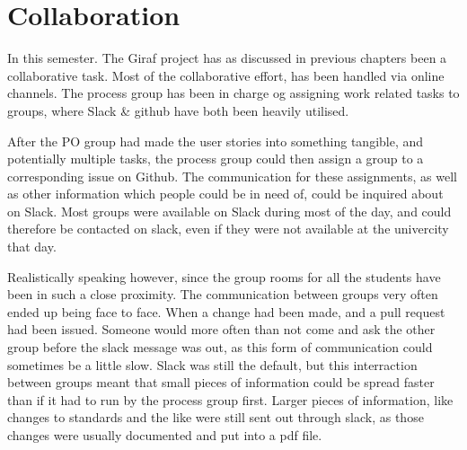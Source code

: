 \section{Collaboration}
In this semester.
The Giraf project has as discussed in previous chapters been a collaborative task.
Most of the collaborative effort, has been handled via online channels.
The process group has been in charge og assigning work related tasks to groups, where Slack \& github have both been heavily utilised.

After the PO group had made the user stories into something tangible, and potentially multiple tasks, the process group could then assign a group to a corresponding issue on Github.
The communication for these assignments, as well as other information which people could be in need of, could be inquired about on Slack.
Most groups were available on Slack during most of the day, and could therefore be contacted on slack, even if they were not available at the univercity that day.

Realistically speaking however, since the group rooms for all the students have been in such a close proximity.
The communication between groups very often ended up being face to face.
When a change had been made, and a pull request had been issued.
Someone would more often than not come and ask the other group before the slack message was out, as this form of communication could sometimes be a little slow.
Slack was still the default, but this interraction between groups meant that small pieces of information could be spread faster than if it had to run by the process group first.
Larger pieces of information, like changes to standards and the like were still sent out through slack, as those changes were usually documented and put into a pdf file.

